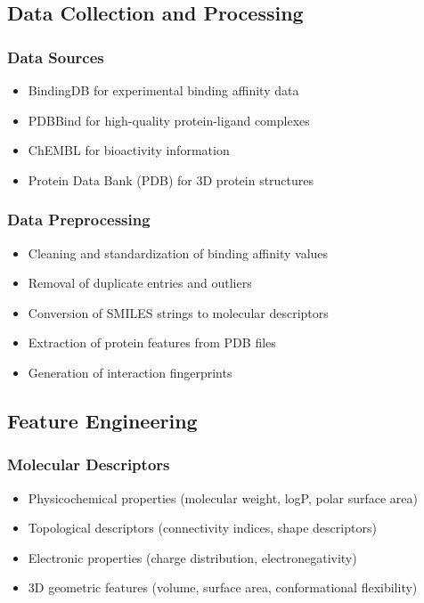 \documentclass[12pt,a4paper]{article}
\begin{document}
\subsection{Data Collection and Processing}
\subsubsection{Data Sources}
\begin{itemize}
    \item BindingDB for experimental binding affinity data
    \item PDBBind for high-quality protein-ligand complexes
    \item ChEMBL for bioactivity information
    \item Protein Data Bank (PDB) for 3D protein structures
\end{itemize}

\subsubsection{Data Preprocessing}
\begin{itemize}
    \item Cleaning and standardization of binding affinity values
    \item Removal of duplicate entries and outliers
    \item Conversion of SMILES strings to molecular descriptors
    \item Extraction of protein features from PDB files
    \item Generation of interaction fingerprints
\end{itemize}

\subsection{Feature Engineering}
\subsubsection{Molecular Descriptors}
\begin{itemize}
    \item Physicochemical properties (molecular weight, logP, polar surface area)
    \item Topological descriptors (connectivity indices, shape descriptors)
    \item Electronic properties (charge distribution, electronegativity)
    \item 3D geometric features (volume, surface area, conformational flexibility)
\end{itemize}
\end{document}
